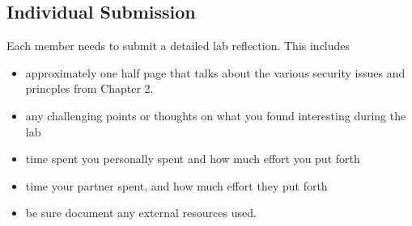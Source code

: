 \documentclass{article}
\begin{document}
\subsection{Individual Submission}
Each member needs to submit a detailed lab reflection. This includes 
\begin{itemize}
\item approximately one half page that talks about the various security issues and princples from Chapter 2. 
\item any challenging points or thoughts on what you found interesting during the lab 
\item time spent you personally spent and how much effort you put forth
\item time your partner spent, and how much effort they put forth
\item be sure document any external resources used. 
\end{itemize}



\vspace{.2in}
\end{document}
